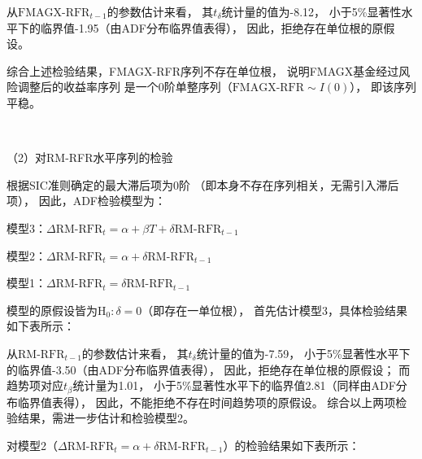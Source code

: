 \documentclass[UTF8]{ctexart}
\begin{document}
从$\text{FMAGX-RFR}_{t-1}$的参数估计来看，
其$t_{\delta}$统计量的值为-8.12，
小于5\%显著性水平下的临界值-1.95（由ADF分布临界值表得），
因此，拒绝存在单位根的原假设。

综合上述检验结果，FMAGX-RFR序列不存在单位根，
说明FMAGX基金经过风险调整后的收益率序列
是一个0阶单整序列（$\text{FMAGX-RFR} \sim I(0)$），
即该序列平稳。

$\ $

（2）对RM-RFR水平序列的检验

根据SIC准则确定的最大滞后项为0阶
（即本身不存在序列相关，无需引入滞后项），
因此，ADF检验模型为：

模型3：$\Delta \text{RM-RFR}_{t} = \alpha + \beta T +\delta \text{RM-RFR}_{t-1}$

模型2：$\Delta \text{RM-RFR}_{t} = \alpha + \delta  \text{RM-RFR}_{t-1}$

模型1：$\Delta \text{RM-RFR}_{t} = \delta \text{RM-RFR}_{t-1}$


模型的原假设皆为$\text{H}_0:\delta=0$（即存在一单位根），
首先估计模型3，具体检验结果如下表所示：


从$\text{RM-RFR}_{t-1}$的参数估计来看，
其$t_{\delta}$统计量的值为-7.59，
小于5\%显著性水平下的临界值-3.50（由ADF分布临界值表得），
因此，拒绝存在单位根的原假设；
而趋势项对应$t_{\beta}$统计量为1.01，
小于5\%显著性水平下的临界值2.81（同样由ADF分布临界值表得），
因此，不能拒绝不存在时间趋势项的原假设。
综合以上两项检验结果，需进一步估计和检验模型2。

对模型2（$\Delta \text{RM-RFR}_{t} = \alpha + \delta  \text{RM-RFR}_{t-1}$）的检验结果如下表所示：
\end{document}
